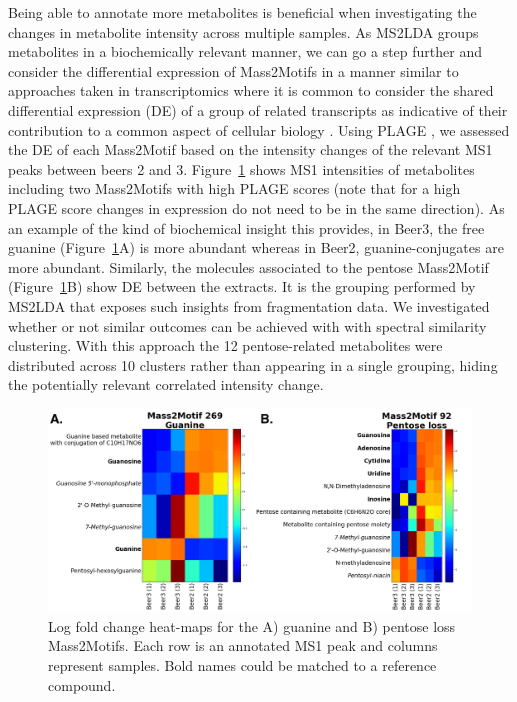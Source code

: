 Being able to annotate more metabolites is beneficial when investigating the changes in metabolite intensity across multiple samples. As MS2LDA groups metabolites in a biochemically relevant manner, we can go a step further and consider the differential expression of Mass2Motifs in a manner similar to approaches taken in transcriptomics where it is common to consider the shared differential expression (DE) of a group of related transcripts as indicative of their contribution to a common aspect of cellular biology \cite{tarca2013comparison}. Using PLAGE \cite{tomfohr2005pathway}, we assessed the DE of each Mass2Motif based on the intensity changes of the relevant MS1 peaks between beers 2 and 3. Figure~\ref{fig:m2lda-heatmaps} shows MS1 intensities of metabolites including two Mass2Motifs with high PLAGE scores (note that for a high PLAGE score changes in expression do not need to be in the same direction). As an example of the kind of biochemical insight this provides, in Beer3, the free guanine (Figure~\ref{fig:m2lda-heatmaps}A) is more abundant whereas in Beer2, guanine-conjugates are more abundant. Similarly, the molecules associated to the pentose Mass2Motif (Figure~\ref{fig:m2lda-heatmaps}B) show DE between the extracts. It is the grouping performed by MS2LDA that exposes such insights from fragmentation data. We investigated whether or not similar outcomes can be achieved with with spectral similarity clustering. With this approach the 12 pentose-related metabolites were distributed across 10 clusters rather than appearing in a single grouping, hiding the potentially relevant correlated intensity change.

\begin{figure}[!htbp]
\centering\includegraphics[width=1.0\linewidth]{07-lda/figures/heatmaps.png}
\centering\caption{Log fold change heat-maps for the A) guanine and B) pentose loss Mass2Motifs. Each row is an annotated MS1 peak and columns represent samples. Bold names could be matched to a reference compound.\label{fig:m2lda-heatmaps}}
\end{figure}

